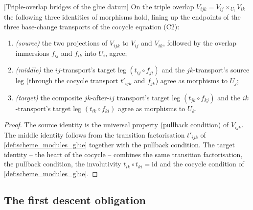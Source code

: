 \begin{lemma}

[Triple-overlap bridges of the glue datum]
  \label{lem:gr_glueData_bridges}
  On the triple overlap \(V_{ijk} = V_{ij}\times_{U_i} V_{ik}\) the following three
  identities of morphisms hold, lining up the endpoints of the three base-change
  transports of the cocycle equation (C2):
  \begin{enumerate}
    \item \emph{(source)} the two projections of \(V_{ijk}\) to \(V_{ij}\) and \(V_{ik}\),
      followed by the overlap immersions \(f_{ij}\) and \(f_{ik}\) into \(U_i\),
      agree;
    \item \emph{(middle)} the \(ij\)-transport's target leg
      \((t_{ij}\circ f_{ji})\) and the \(jk\)-transport's source leg
      (through the cocycle transport \(t'_{ijk}\) and \(f_{jk}\)) agree as morphisms
      to \(U_j\);
    \item \emph{(target)} the composite \(jk\)-after-\(ij\) transport's target leg
      \((t_{jk}\circ f_{kj})\) and the \(ik\)-transport's target leg
      \((t_{ik}\circ f_{ki})\) agree as morphisms to \(U_k\).
  \end{enumerate}
\end{lemma}
\begin{proof}
  The source identity is the universal property (pullback condition) of \(V_{ijk}\).
  The middle identity follows from the transition factorisation
  \(t'_{ijk}\) of \cref{def:scheme_modules_glue} together with the pullback condition.
  The target identity -- the heart of the cocycle -- combines the same transition
  factorisation, the pullback condition, the involutivity \(t_{ik}\circ t_{ki}=\mathrm{id}\)
  and the cocycle condition of \cref{def:scheme_modules_glue}.
\end{proof}


\subsection{The first descent obligation}

